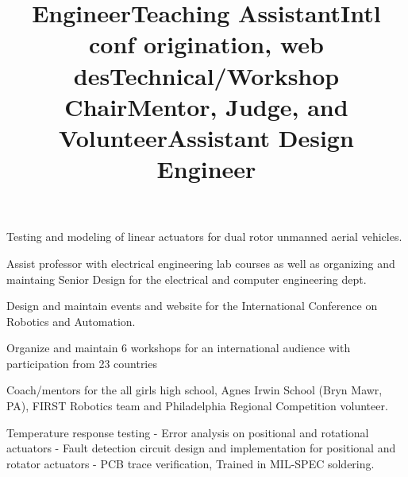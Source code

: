 \begin{resume}
\title{Engineer}
\begin{position}
Testing and modeling of linear actuators for dual rotor unmanned aerial vehicles.
\end{position}




\title{Teaching Assistant}
\begin{position}
Assist professor with electrical engineering lab courses as well as organizing and maintaing Senior Design for the electrical and computer engineering dept.
\end{position}



\title{Intl conf origination, web des}
\begin{position}
Design and maintain events and website for the International Conference on Robotics and Automation.
\end{position}




\title{Technical/Workshop Chair}
\begin{position}
Organize and maintain 6 workshops for an international audience with participation from 23 countries
\end{position}


\title{Mentor, Judge, and Volunteer}
\begin{position}
Coach/mentors for the all girls high school, Agnes Irwin School (Bryn Mawr, PA), FIRST Robotics team and Philadelphia Regional Competition volunteer.
\end{position}


\title{Assistant Design Engineer}
\begin{position}
Temperature response testing - Error analysis on positional and rotational actuators - Fault detection circuit design and implementation for positional and rotator actuators - PCB trace verification, Trained in MIL-SPEC soldering.
\end{position}


\end{resume}
